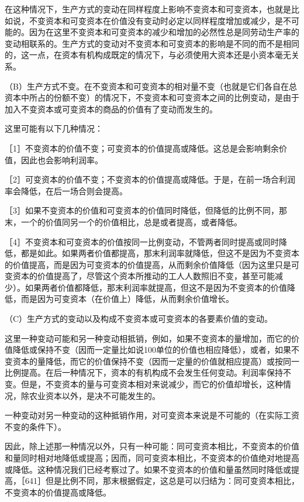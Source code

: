 在这种情况下，生产方式的变动在同样程度上影响不变资本和可变资本，也就是比如说，不变资本和可变资本在价值没有变动时必定以同样程度增加或减少，是不可能的。因为在这里不变资本和可变资本的减少和增加的必然性总是同劳动生产率的变动相联系的。生产方式的变动对不变资本和可变资本的影响是不同的而不是相同的，这一点，在资本有机构成既定的情况下，与必须使用大资本还是小资本毫无关系。

（B）生产方式不变。在不变资本和可变资本的相对量不变（也就是它们各自在总资本中所占的份额不变）的情况下，不变资本和可变资本之间的比例变动，是由于加入不变资本或可变资本的商品的价值有了变动而发生的。

这里可能有以下几种情况：

［1］不变资本的价值不变；可变资本的价值提高或降低。这总是会影响剩余价值，因此也会影响利润率。

［2］可变资本的价值不变；不变资本的价值提高或降低。于是，在前一场合利润率会降低，在后一场合则会提高。

［3］如果不变资本的价值和可变资本的价值同时降低，但降低的比例不同，那末，一个的价值同另一个的价值相比，总是或者提高，或者降低。

［4］不变资本和可变资本的价值按同一比例变动，不管两者同时提高或同时降低，都是如此。如果两者价值都提高，那末利润率就降低，但这不是因为不变资本的价值提高，而是因为可变资本的价值提高，从而剩余价值降低（因为这里只是可变资本的价值提高了，尽管这个资本所推动的工人人数照旧不变，甚至可能减少）。如果两者价值都降低，那末利润率就提高，但这不是因为不变资本的价值降低，而是因为可变资本（在价值上）降低，从而剩余价值增长。

（C）生产方式的变动以及构成不变资本或可变资本的各要素价值的变动。

这里一种变动可能和另一种变动相抵销，例如，如果不变资本的量增加，而它的价值降低或保持不变（因而一定量比如说100单位的价值也相应降低），或者，如果不变资本的量降低，而它的价值保持不变（因而一定量的价值就相应提高）或按同一比例提高。在后一种情况下，资本的有机构成不会发生任何变动。利润率保持不变。但是，不变资本的量与可变资本相对来说减少，而它的价值却增长，这种情况，除农业资本以外，是决不可能发生的。

一种变动对另一种变动的这种抵销作用，对可变资本来说是不可能的（在实际工资不变的条件下）。

因此，除上述那一种情况以外，只有一种可能：同可变资本相比，不变资本的价值和量同时相对地降低或提高；因而，同可变资本相比，不变资本的价值绝对地提高或降低。这种情况我们已经考察过了。如果不变资本的价值和量虽然同时降低或提高，［641］但是比例不同，那末根据假定，这总是可以归结为：同可变资本相比，不变资本的价值提高或降低。


